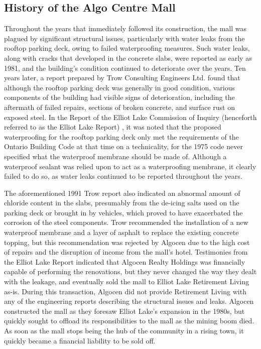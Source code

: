 \documentclass[12pt]{article}
\begin{document}
\subsection{History of the Algo Centre Mall}

Throughout the years that immediately followed its construction, the mall was plagued by significant structural issues, particularly with water leaks from the rooftop parking deck, owing to failed waterproofing measures. Such water leaks, along with cracks that developed in the concrete slabs, were reported as early as 1981, and the building's condition continued to deteriorate over the years. Ten years later, a report prepared by Trow Consulting Engineers Ltd. found that although the rooftop parking deck was generally in good condition, various components of the building had visible signs of deterioration, including the aftermath of failed repairs, sections of broken concrete, and surface rust on exposed steel. In the Report of the Elliot Lake Commission of Inquiry (henceforth referred to as the Elliot Lake Report) \cite{AlgoLakeReport1}, it was noted that the proposed waterproofing for the rooftop parking deck only met the requirements of the Ontario Building Code at that time on a technicality, for the 1975 code never specified what the waterproof membrane should be made of. Although a waterproof sealant was relied upon to act as a waterproofing membrane, it clearly failed to do so, as water leaks continued to be reported throughout the years. 

The aforementioned 1991 Trow report also indicated an abnormal amount of chloride content in the slabs, presumably from the de-icing salts used on the parking deck or brought in by vehicles, which proved to have exacerbated the corrosion of the steel components. Trow recommended the installation of a new waterproof membrane and a layer of asphalt to replace the existing concrete topping, but this recommendation was rejected by Algocen due to the high cost of repairs and the disruption of income from the mall's hotel. Testimonies from the Elliot Lake Report indicated that Algocen Realty Holdings was financially capable of performing the renovations, but they never changed the way they dealt with the leakage, and eventually sold the mall to Elliot Lake Retirement Living as-is. During this transaction, Algocen did not provide Retirement Living with any of the engineering reports describing the structural issues and leaks. Algocen constructed the mall as they foresaw Elliot Lake's expansion in the 1980s, but quickly sought to offload its responsibilities to the mall as the mining boom died. As soon as the mall stops being the hub of the community in a rising town, it quickly became a financial liability to be sold off. 
\end{document}
